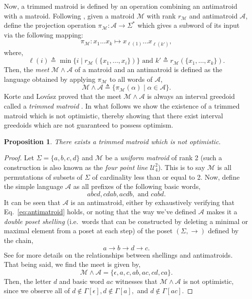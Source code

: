 \documentclass[11pt]{article}
\newtheorem{proposition}[theorem]{Proposition}
\newcommand{\univ}{\Sigma}
\begin{document}
Now, a trimmed matroid is defined by an operation combining an antimatroid with a matroid.
Following \cite{korte1988intersection,korte2012greedoids}, given a matroid $\mathcal{M}$ with rank $r_\mathcal{M}$ and antimatroid $\mathcal{A}$, define the projection operation $\pi_\mathcal{M}:\mathcal{A}\to \univ^*$ which gives a subword of its input via the following mapping:
\[
    \pi_\mathcal{M}:x_1\ldots x_k \mapsto x_{\ell(1)} \ldots x_{\ell(k')},
\]
where,
\[
\ell(i) \triangleq \min\big\{i\mid r_\mathcal{M}(\{x_1, \ldots, x_i\})\big\}\text{ and } k'\triangleq r_\mathcal{M}(\{x_1, \ldots, x_k\}).
\]
Then, the \emph{meet} $\mathcal{M}\wedge \mathcal{A}$ of a matroid and an antimatroid is defined as the language obtained by applying $\pi_\mathcal{M}$ to all words of $\mathcal{A}$,
\[
    \mathcal{M}\wedge\mathcal{A}\triangleq \{\pi_\mathcal{M}(\alpha)\mid \alpha \in \mathcal{A}\}.
\]
Korte and Lovász proved that the meet $\mathcal{M}\wedge \mathcal{A}$ is always an interval greedoid called a \emph{trimmed matroid} \cite{korte1988intersection}.
In what follows we show the existence of a trimmed matroid which is not optimistic, thereby showing that there exist interval greedoids which are not guaranteed to possess optimism.

\begin{proposition}
    There exists a trimmed matroid which is not optimistic.
\end{proposition}
\begin{proof}
    Let $\univ = \{a,b,c,d\}$ and $\mathcal{M}$ be a \emph{uniform matroid} of rank 2 (such a construction is also known as the \emph{four point line $\mathcal{U}^2_4$}).
    This is to say $\mathcal{M}$ is all permutations of subsets of $\univ$ of cardinality less than or equal to 2.
    Now, define the simple language $\mathcal{A}$ as all prefixes of the following basic words,
    \[
        abcd,cdab,acdb,\text{ and }cabd.
    \]
    It can be seen that $\mathcal{A}$ is an antimatroid, either by exhaustively verifying that Eq.~\ref{eq:antimatroid} holds, or noting that the way we've defined $\mathcal{A}$ makes it a \emph{double poset shelling} (i.e.\ words that can be constructed by deleting a minimal or maximal element from a poset at each step) of the poset $(\univ,\rightarrow)$ defined by the chain,
    \[
        a\rightarrow b \rightarrow d \rightarrow c.
    \]
    See \cite{korte2012greedoids} for more details on the relationships between shellings and antimatroids.
    That being said, we find the meet is given by,
    \[
        \mathcal{M}\wedge\mathcal{A} = \{\epsilon, a, c, ab, ac, cd, ca\}.
    \]
    Then, the letter $d$ and basic word $ac$ witnesses that $\mathcal{M}\wedge \mathcal{A}$ is not optimistic, since we observe all of $d\notin\Gamma[\epsilon], d \notin \Gamma[a],$ and $d \notin \Gamma[ac].$
\end{proof}
\fi
\end{document}
